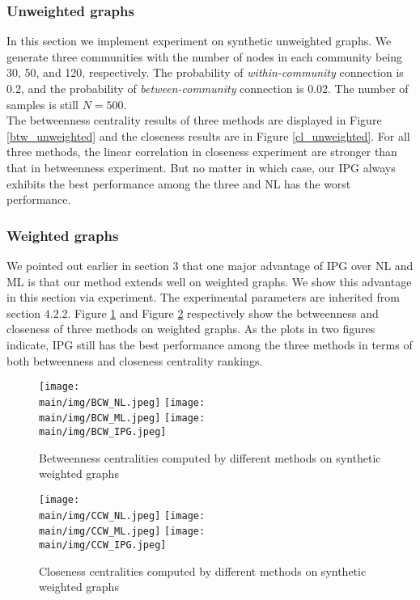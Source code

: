 \documentclass[\main/thesis.tex]{subfiles}
\begin{document}
\subsubsection{Unweighted graphs}
In this section we implement experiment on synthetic unweighted graphs. We generate three communities with the number of nodes in each community being 30, 50, and 120, respectively. The probability of \textit{within-community} connection is 0.2, and the probability of \textit{between-community} connection is 0.02. The number of samples is still $N = 500$.\\ 
The betweenness centrality results of three methods are displayed in Figure \ref{btw_unweighted} and the closeness results are in Figure \ref{cl_unweighted}. For all three methods, the linear correlation in closeness experiment are stronger than that in betweenness experiment. But no matter in which case, our IPG always exhibits the best performance among the three and NL has the worst performance.

\subsubsection{Weighted graphs}
We pointed out earlier in section 3 that one major advantage of IPG over NL and ML is that our method extends well on weighted graphs. We show this advantage in this section via experiment. The experimental parameters are inherited from section $4.2.2$. Figure \ref{btw_weighted} and Figure \ref{cl_weighted} respectively show the betweenness and closeness of three methods on weighted graphs. As the plots in two figures indicate, IPG still has the best performance among the three methods in terms of both betweenness and closeness centrality rankings.

\begin{figure}
\texttt{[image: \\main/img/BCW\_NL.jpeg]}
\texttt{[image: \\main/img/BCW\_ML.jpeg]}
\centering
\texttt{[image: \\main/img/BCW\_IPG.jpeg]}
\caption{Betweenness centralities computed by different methods on synthetic weighted graphs}
\label{btw_weighted}
\end{figure}


\begin{figure}
\texttt{[image: \\main/img/CCW\_NL.jpeg]}
\texttt{[image: \\main/img/CCW\_ML.jpeg]}
\centering
\texttt{[image: \\main/img/CCW\_IPG.jpeg]}
\caption{Closeness centralities computed by different methods on synthetic weighted graphs}
\label{cl_weighted}
\end{figure}
\end{document}
